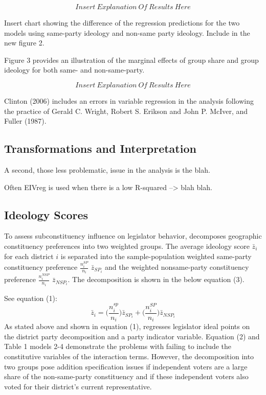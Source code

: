 \documentclass[10pt,letterpaper]{article}
\begin{document}
$$Insert ~ Explanation~Of~Results~Here$$

Insert chart showing the difference of the regression predictions for the two models using same-party ideology and non-same party ideology. Include in the new figure 2.

Figure 3 provides an illustration of the marginal effects of group share and group ideology for both same- and non-same-party.

$$Insert ~ Explanation~Of~Results~Here$$




 

 

Clinton (2006) includes an errors in variable regression in the analysis following the practice of Gerald C. Wright, Robert S. Erikson and John P. McIver, and Fuller (1987).


\newpage

\subsection{Transformations and Interpretation}
A second, those less problematic, issue in the \cite{Clinton2006} analysis is the blah.

Often EIVreg is used when there is a low R-squared --> blah blah.

\newpage


\subsection{Ideology Scores}
To assess subconstituency influence on legislator behavior, \cite{Clinton2006} decomposes geographic constituency preferences into two weighted groups. The average ideology score $\bar{z}_i$ for each district $i$ is separated into the sample-population weighted same-party constituency preference $\frac{n_i^{SP}}{n_i}$ $\bar{z}_{SP_i}$ and the weighted nonsame-party constituency preference $\frac{n_i^{NSP}}{n_i}$ $\bar{z}_{NSP_i}$. The decomposition is shown in the below equation (3).

See equation (1):
\begin{equation}
\bar{z}_i = \bigg( \frac{n_i^{sp}}{n_i} \bigg) \bar{z}_{SP_i} + \bigg( \frac{n_i^{SP}}{n_i} \bigg) \bar{z}_{NSP_i}
\end{equation}
As stated above and shown in equation (1), \cite{Clinton2006} regresses legislator ideal points on the district party decomposition and a party indicator variable. Equation (2) and Table 1 models 2-4 demonstrate the problems with failing to include the constitutive variables of the interaction terms. However, the decomposition into two groups pose addition specification issues if independent voters are a large share of the non-same-party constituency and if these independent voters also voted for their district's current representative. 
\end{document}
